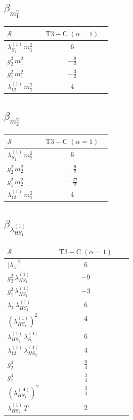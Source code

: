\documentclass[9pt]{article}
\begin{document}
\subsection*{$ \beta_{m_1^{2}} $}
\begin{longtable}{@{}p{0.31\linewidth}c@{}}
\toprule
$\mathcal{S}$ & $ \mathrm{T3-C}\;(\alpha=1) $ \\
\midrule
$ \lambda_{S_1}^{(1)}\,m_1^{2} $ & $ 6 $ \\
$ g_2^2\,m_1^{2} $ & $ - \frac{9}{2} $ \\
$ g_1^2\,m_1^{2} $ & $ - \frac{3}{2} $ \\
$ \lambda_{12}^{(1)}\,m_2^{2} $ & $ 4 $ \\
\bottomrule
\end{longtable}
\subsection*{$ \beta_{m_2^{2}} $}
\begin{longtable}{@{}p{0.31\linewidth}c@{}}
\toprule
$\mathcal{S}$ & $ \mathrm{T3-C}\;(\alpha=1) $ \\
\midrule
$ \lambda_{S_2}^{(1)}\,m_2^{2} $ & $ 6 $ \\
$ g_2^2\,m_2^{2} $ & $ - \frac{9}{2} $ \\
$ g_1^2\,m_2^{2} $ & $ - \frac{27}{2} $ \\
$ \lambda_{12}^{(1)}\,m_1^{2} $ & $ 4 $ \\
\bottomrule
\end{longtable}
\subsection*{$ \beta_{\lambda_{HS_1}^{(1)}} $}
\begin{longtable}{@{}p{0.31\linewidth}c@{}}
\toprule
$\mathcal{S}$ & $ \mathrm{T3-C}\;(\alpha=1) $ \\
\midrule
$ |\lambda_5|^2 $ & $ 6 $ \\
$ g_2^2\,\lambda_{HS_1}^{(1)} $ & $ -9 $ \\
$ g_1^2\,\lambda_{HS_1}^{(1)} $ & $ -3 $ \\
$ \lambda_1\,\lambda_{HS_1}^{(1)} $ & $ 6 $ \\
$ \left(\lambda_{HS_1}^{(1)}\right)^2 $ & $ 4 $ \\
$ \lambda_{HS_1}^{(1)}\,\lambda_{S_1}^{(1)} $ & $ 6 $ \\
$ \lambda_{12}^{(1)}\,\lambda_{HS_2}^{(1)} $ & $ 4 $ \\
$ g_2^4 $ & $ \frac{9}{4} $ \\
$ g_1^4 $ & $ \frac{3}{4} $ \\
$ \left(\lambda_{HS_1}^{(A)}\right)^2 $ & $ \frac{3}{4} $ \\
$ \lambda_{HS_1}^{(1)}\,T $ & $ 2 $ \\
\bottomrule
\end{longtable}
\end{document}
